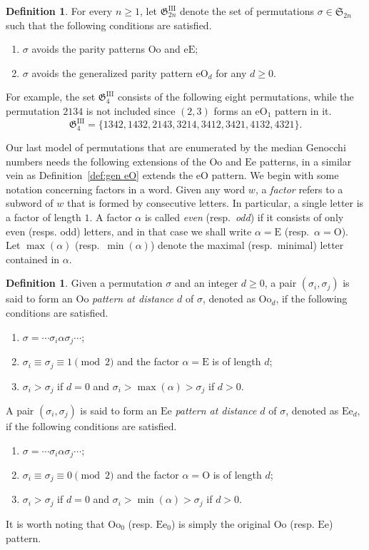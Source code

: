 \documentclass[11pt,reqno]{amsart}
\numberwithin{equation}{section}
\theoremstyle{plain}
\theoremstyle{definition}
\newtheorem{Def}[theorem]{Definition}
\renewcommand{\S}{\mathfrak{S}}
\newcommand{\fG}{\mathfrak{G}}
\newcommand{\GIII}{\fG^{\mathrm{III}}}
\def\eE{\mathrm{eE}}
\def\eO{\mathrm{eO}}
\def\Oo{\mathrm{Oo}}
\def\Ee{\mathrm{Ee}}
\begin{document}
\begin{Def}
	For every $n\ge 1$, let $\GIII_{2n}$ denote the set of permutations $\sigma\in\S_{2n}$ such that the following conditions are satisfied.
	\begin{enumerate}
		\item $\sigma$ avoids the parity patterns $\Oo$ and $\eE$;
		\item $\sigma$ avoids the generalized parity pattern $\eO_d$ for any $d\ge 0$.
	\end{enumerate}
	
\end{Def}
For example, the set $\GIII_{4}$ consists of the following eight permutations, while the permutation $2134$ is not included since $(2,3)$ forms an $\eO_1$ pattern in it.
$$\GIII_{4}=\{1342,1432,2143,3214,3412,3421,4132,4321\}.$$

Our last model of permutations that are enumerated by the median Genocchi numbers needs the following extensions of the $\Oo$ and $\Ee$ patterns, in a similar vein as Definition~\ref{def:gen eO} extends the $\eO$ pattern. We begin with some notation concerning factors in a word. Given any word $w$, a \emph{factor} refers to a subword of $w$ that is formed by consecutive letters. In particular, a single letter is a factor of length $1$. A factor $\alpha$ is called \emph{even} (resp.~\emph{odd}) if it consists of only even (resps. odd) letters, and in that case we shall write $\alpha=\mathrm{E}$ (resp.~$\alpha=\mathrm{O}$). Let $\max(\alpha)$ (resp.~$\min(\alpha)$) denote the maximal (resp.~minimal) letter contained in $\alpha$.

\begin{Def}\label{def:gen Oo and Ee}
	Given a permutation $\sigma$ and an integer $d\ge 0$, a pair $(\sigma_i,\sigma_j)$ is said to form an $\Oo$ \emph{pattern at distance $d$} of $\sigma$, denoted as $\Oo_d$, if the following conditions are satisfied.
	\begin{enumerate}
		\item $\sigma=\cdots\sigma_i\alpha\sigma_j\cdots$;
		\item $\sigma_i\equiv\sigma_j \equiv 1\pmod 2$ and the factor $\alpha=\mathrm{E}$ is of length $d$;
		\item $\sigma_i>\sigma_j$ if $d=0$ and $\sigma_i>\max(\alpha)>\sigma_j$ if $d>0$.
	\end{enumerate}
	A pair $(\sigma_i,\sigma_j)$ is said to form an $\Ee$ \emph{pattern at distance $d$} of $\sigma$, denoted as $\Ee_d$, if the following conditions are satisfied.
	\begin{enumerate}
		\item $\sigma=\cdots\sigma_i\alpha\sigma_j\cdots$;
		\item $\sigma_i\equiv\sigma_j \equiv 0 \pmod 2$ and the factor $\alpha=\mathrm{O}$ is of length $d$;
		\item $\sigma_i>\sigma_j$ if $d=0$ and $\sigma_i>\min(\alpha)>\sigma_j$ if $d>0$.
	\end{enumerate}
\end{Def}
It is worth noting that $\Oo_0$ (resp. $\Ee_0$) is simply the original $\Oo$ (resp. $\Ee$) pattern.
\end{document}
